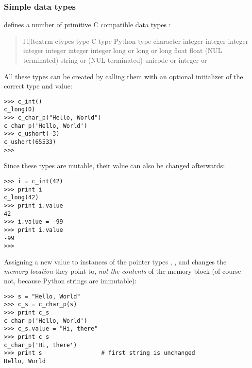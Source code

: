 \subsubsection{Simple data types\label{ctypes-simple-data-types}}

 defines a number of primitive C compatible data types :
\begin{quote}
\begin{tableiii}{l|l|l}{textrm}
{
ctypes type
}
{
C type
}
{
Python type
}
{
}
{
character
}
{
}
{
integer
}
{
}
{
integer
}
{
}
{
integer
}
{
}
{
integer
}
{
}
{
integer
}
{
}
{
integer
}
{
}
{
integer
}
{
}
{
long
}
{
 or
}
{
long
}
{
 or
}
{
long
}
{
}
{
float
}
{
}
{
float
}
{
(NUL terminated)
}
{
string or
}
{
(NUL terminated)
}
{
unicode or
}
{
}
{
integer or
}
\end{tableiii}
\end{quote}

All these types can be created by calling them with an optional
initializer of the correct type and value:
\begin{verbatim}
>>> c_int()
c_long(0)
>>> c_char_p("Hello, World")
c_char_p('Hello, World')
>>> c_ushort(-3)
c_ushort(65533)
>>>
\end{verbatim}

Since these types are mutable, their value can also be changed
afterwards:
\begin{verbatim}
>>> i = c_int(42)
>>> print i
c_long(42)
>>> print i.value
42
>>> i.value = -99
>>> print i.value
-99
>>>
\end{verbatim}

Assigning a new value to instances of the pointer types ,
, and  changes the \emph{memory location} they
point to, \emph{not the contents} of the memory block (of course not,
because Python strings are immutable):
\begin{verbatim}
>>> s = "Hello, World"
>>> c_s = c_char_p(s)
>>> print c_s
c_char_p('Hello, World')
>>> c_s.value = "Hi, there"
>>> print c_s
c_char_p('Hi, there')
>>> print s                 # first string is unchanged
Hello, World
\end{verbatim}

